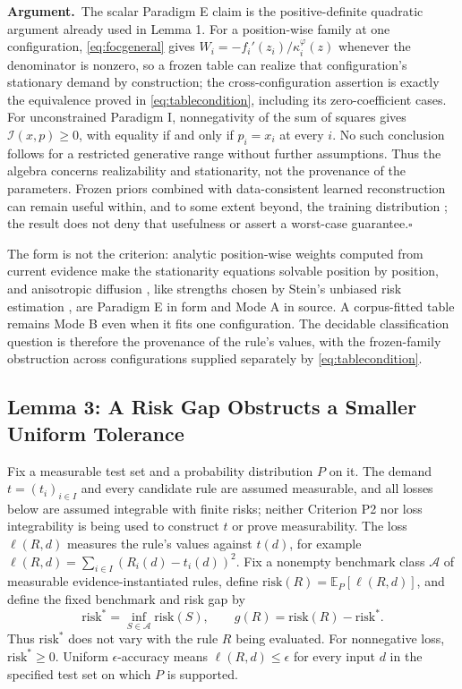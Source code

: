 \documentclass[twoside,11pt]{article}
\newcommand{\argument}{\par\medskip\noindent\textbf{Argument.}\ }
\newcommand{\qedbox}{\hfill$\square$}
\begin{document}
\argument The scalar Paradigm E claim is the positive-definite quadratic argument already used in Lemma 1. For a position-wise family at one configuration, \eqref{eq:focgeneral} gives $W_i=-f_i'(z_i)/\kappa_i^{\varphi}(z)$ whenever the denominator is nonzero, so a frozen table can realize that configuration's stationary demand by construction; the cross-configuration assertion is exactly the equivalence proved in \eqref{eq:tablecondition}, including its zero-coefficient cases. For unconstrained Paradigm I, nonnegativity of the sum of squares gives $\mathcal{I}(x,p)\geq0$, with equality if and only if $p_i=x_i$ at every $i$. No such conclusion follows for a restricted generative range without further assumptions. Thus the algebra concerns realizability and stationarity, not the provenance of the parameters. Frozen priors combined with data-consistent learned reconstruction can remain useful within, and to some extent beyond, the training distribution \citep{haltmeier2026}; the result does not deny that usefulness or assert a worst-case guarantee.\qedbox

The form is not the criterion: analytic position-wise weights computed from current evidence make the stationarity equations solvable position by position, and anisotropic diffusion \citep{perona1990}, like strengths chosen by Stein's unbiased risk estimation \citep{stein1981}, are Paradigm E in form and Mode A in source. A corpus-fitted table remains Mode B even when it fits one configuration. The decidable classification question is therefore the provenance of the rule's values, with the frozen-family obstruction across configurations supplied separately by \eqref{eq:tablecondition}.

\subsection{Lemma 3: A Risk Gap Obstructs a Smaller Uniform Tolerance}

Fix a measurable test set and a probability distribution $P$ on it. The demand $t=(t_i)_{i\in I}$ and every candidate rule are assumed measurable, and all losses below are assumed integrable with finite risks; neither Criterion P2 nor loss integrability is being used to construct $t$ or prove measurability. The loss $\ell(R,d)$ measures the rule's values against $t(d)$, for example $\ell(R,d)=\sum_{i\in I}(R_i(d)-t_i(d))^2$. Fix a nonempty benchmark class $\mathcal{A}$ of measurable evidence-instantiated rules, define $\mathrm{risk}(R)=\mathbb{E}_P[\ell(R,d)]$, and define the fixed benchmark and risk gap by
\begin{equation}
\mathrm{risk}^* = \inf_{S\in\mathcal{A}}\mathrm{risk}(S), \qquad g(R) = \mathrm{risk}(R) - \mathrm{risk}^* .
\label{eq:gap}
\end{equation}
Thus $\mathrm{risk}^*$ does not vary with the rule $R$ being evaluated. For nonnegative loss, $\mathrm{risk}^*\geq0$. Uniform $\epsilon$-accuracy means $\ell(R,d)\leq\epsilon$ for every input $d$ in the specified test set on which $P$ is supported.
\end{document}
